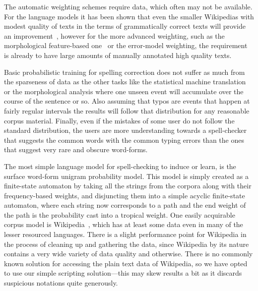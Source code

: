 \documentclass[a4paper,12pt]{article}
\begin{document}
The automatic weighting schemes require data, which often may not be available.
For the language models it has been shown that even the smaller Wikipedias
with modest quality of texts in the terms of grammatically correct texts will
provide an improvement~\cite[]{pirinen/2010/lrec}, however for the more
advanced weighting, such as the morphological feature-based
one~\cite[]{pirinen2012improving} or the error-model weighting, the requirement
is already to have large amounts of manually annotated high quality texts. 

Basic probabilistic training for spelling correction does not suffer as much
from the sparseness of data as the other tasks like the statistical machine
translation or the morphological analysis where one unseen event will
accumulate over the course of the sentence or so. Also assuming that typos are
events that happen at fairly regular intervals the results will follow that
distribution for any reasonable corpus material. Finally, even if the mistakes
of some user do not follow the standard distribution, the users are more
understanding towards a spell-checker that suggests the common words with the
common typing errors than the ones that suggest very rare and obscure
word-forms.

The most simple language model for spell-checking to induce or learn, is
the surface word-form unigram probability model. This model is simply created
as a finite-state automaton by taking all the strings from the corpora along
with their frequency-based weights, and disjuncting them into a simple acyclic
finite-state automaton, where each string now corresponds to a path and the end
weight of the path is the probability cast into a tropical weight. One easily
acquirable corpus model is Wikipedia~\cite[]{pirinen/2010/lrec}, which has at
least some data even in many of the lesser resourced languages. There is a
slight performance point for Wikipedia in the process of cleaning up and
gathering the data, since Wikipedia by its nature contains a very wide variety
of data quality and otherwise. There is no commonly known solution for
accessing the plain text data of Wikipedia, so we have opted to use our
simple scripting solution---this may skew results a bit as it discards
suspicious notations quite generously.
\end{document}
